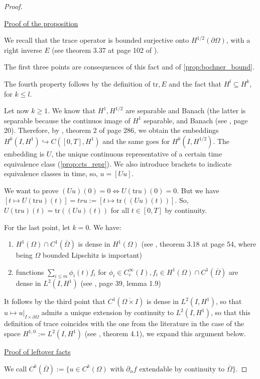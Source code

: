 \documentclass[english,a4paper,9pt,oneside]{scrbook}	%
\theoremstyle{break}
\newenvironment{mproof}[1][\proofname]{%
  \begin{proof}[#1]$ $\par\nobreak\ignorespaces
}{%
  \end{proof}
}
\renewcommand*{\proofname}{Proof}
\theoremstyle{remark}
\newcommand{\tr}{\text{tr}}
\newcommand{\emb}{\hookrightarrow}
\begin{document}
\begin{appendices}
\begin{mproof}
\underline{Proof of the proposition}

We recall that the trace operator is bounded surjective onto $H^{1/2}(\partial \Omega)$, with a right inverse $E$ (see theorem 3.37 at page 102 of \cite{mclean}).

The first three points are consequences of this fact and of \cref{prop:bochner_bound}.

The fourth property follows by the definition of $\tr, E$ and the fact that $H^l\subseteq H^k$, for $k\leq l$.

Let now $k\geq 1$. We know that $H^1, H^{1/2}$ are separable and Banach (the latter is separable because the continuos image of $H^1$ separable, and Banach (see \cite{grisvard}, page 20). Therefore, by \cite{evans}, theorem 2 of page 286, we obtain the embeddings $H^k(I,H^1)\emb C([0,T],H^1)$ and the same goes for $H^k(I,H^{1/2})$. The embedding is $U$, the unique continuous representative of a certain time equivalence class (\cref{prop:cts_repr}). We also introduce brackets to indicate equivalence classes in time, so, $u = [Uu]$.

We want to prove $(Uu)(0)=0 \iff U(\tr u)(0)=0$. But we have $[t \mapsto U(\tr u )(t)]=tru:=[t \mapsto \tr((Uu)(t))]$. So, $U(\tr u )(t)=\tr((Uu)(t))$ for all $t\in[0,T]$ by continuity. 

For the last point, let $k=0$. We have:

\begin{enumerate}
\item $H^1(\Omega)\cap C^1(\overline{\Omega})$ is dense in $H^1(\Omega)$ (see \cite{adams}, theorem 3.18 at page 54, where being $\Omega$ bounded Lipschitz is important)
\item functions $\sum_{i\leq m} \phi_i(t)f_i$ for $\phi_i \in C_c^\infty(I), f_i \in H^1(\Omega)\cap C^1(\overline{\Omega})$ are dense in $L^2(I,H^1)$ (see \cite{hinze}, page 39, lemma 1.9)
\end{enumerate}

It follows by the third point that $C^1(\overline{\Omega\times I})$ is dense in $L^2(I,H^1)$, so that $u\mapsto u|_{I\times \partial \Omega}$ admits a unique extension by continuity to $L^2(I,H^1)$, so that this definition of trace coincides with the one from the literature in the case of the space $H^{1,0}:=L^2(I,H^1)$ (see \cite{lions}, theorem 4.1), we expand this argument below.

\underline{Proof of leftover facts}

We call $C^k(\overline{\Omega}):=\{u \in C^k(\Omega) \text{ with }\partial_\alpha f \text{ extendable by continuity to } \overline{\Omega} \}$. 


\end{mproof}
\end{appendices}
\end{document}
